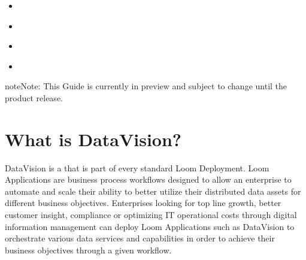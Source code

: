 \documentclass[letterpaper,10pt,english]{sphinxmanual}
\begin{document}
\begin{sphinxShadowBox}
\begin{itemize}
\item {} 
\label{\detokenize{loom_trbs_faq:id39}}{\hyperref[\detokenize{loom_trbs_faq:datavision-does-it-show-alerts-and-notifications-related-to-enterprise-data-access-breaches}]{}}

\item {} 
\label{\detokenize{loom_trbs_faq:id40}}{\hyperref[\detokenize{loom_trbs_faq:how-do-i-configure-datavision-to-gain-visibility-into-enterprise-content-repositories}]{}}

\item {} 
\label{\detokenize{loom_trbs_faq:id41}}{\hyperref[\detokenize{loom_trbs_faq:does-datavision-provide-a-means-to-gain-insight-into-pii-data}]{}}

\item {} 
\label{\detokenize{loom_trbs_faq:id42}}{\hyperref[\detokenize{loom_trbs_faq:other-faq}]{}}

\end{itemize}
\end{sphinxShadowBox}

\begin{sphinxadmonition}{note}{Note:}
This Guide is currently in preview and subject to change until the product release.
\end{sphinxadmonition}


\section{What is DataVision?}
\label{\detokenize{loom_trbs_faq:what-is-datavision}}
DataVision is a  that is part of every standard Loom Deployment. Loom Applications are business process workflows designed to allow an enterprise to automate and scale their ability to better utilize their distributed data assets for different business objectives. Enterprises looking for top line growth, better customer insight, compliance or optimizing IT operational costs through digital information management can deploy Loom Applications such as DataVision to orchestrate various data services and capabilities in order to achieve their business objectives through a given workflow.
\end{document}
